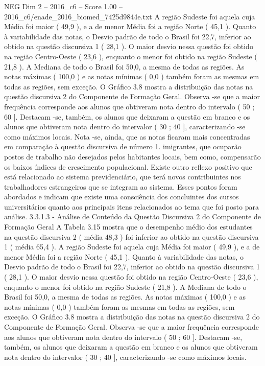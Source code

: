\begin{textsample}{NEG Dim 2 – 2016\_c6 – Score 1.00 – 2016\_c6/enade\_2016\_biomed\_7425d9844e.txt}
A região Sudeste foi aquela cuja Média foi maior ( 49,9 ), e a de menor Média foi a região Norte ( 45,1 ).
Quanto à variabilidade das notas, o Desvio padrão de todo o Brasil foi 22,7, inferior ao obtido na questão discursiva 1 ( 28,1 ).
O maior desvio nessa questão foi obtido na região Centro-Oeste ( 23,6 ), enquanto o menor foi obtido na região Sudeste ( 21,8 ).
A Mediana de todo o Brasil foi 50,0, a mesma de todas as regiões.
As notas máximas ( 100,0 ) e as notas mínimas ( 0,0 ) também foram as mesmas em todas as regiões, sem exceção.
O Gráfico 3.8 mostra a distribuição das notas na questão discursiva 2 do Componente de Formação Geral.
Observa -se que a maior frequência corresponde aos alunos que obtiveram nota dentro do intervalo ( 50 ; 60 ].
Destacam -se, também, os alunos que deixaram a questão em branco e os alunos que obtiveram nota dentro do intervalor ( 30 ; 40 ], caracterizando -se como máximos locais.
Nota -se, ainda, que as notas ficaram mais concentradas em comparação à questão discursiva de número 1. imigrantes, que ocuparão postos de trabalho não desejados pelos habitantes locais, bem como, compensarão os baixos índices de crescimento populacional.
Existe outro reflexo positivo que está relacionado ao sistema previdenciário, que terá novos contribuintes nos trabalhadores estrangeiros que se integram ao sistema.
Esses pontos foram abordados e indicam que existe uma consciência dos concluintes dos cursos universitários quanto aos principais itens relacionados ao tema que foi posto para análise. 3.3.1.3 - Análise de Conteúdo da Questão Discursiva 2 do Componente de Formação Geral A Tabela 3.15 mostra que o desempenho médio dos estudantes na questão discursiva 2 ( média 48,3 ) foi inferior ao obtido na questão discursiva 1 ( média 65,4 ).
A região Sudeste foi aquela cuja Média foi maior ( 49,9 ), e a de menor Média foi a região Norte ( 45,1 ).
Quanto à variabilidade das notas, o Desvio padrão de todo o Brasil foi 22,7, inferior ao obtido na questão discursiva 1 ( 28,1 ).
O maior desvio nessa questão foi obtido na região Centro-Oeste ( 23,6 ), enquanto o menor foi obtido na região Sudeste ( 21,8 ).
A Mediana de todo o Brasil foi 50,0, a mesma de todas as regiões.
As notas máximas ( 100,0 ) e as notas mínimas ( 0,0 ) também foram as mesmas em todas as regiões, sem exceção.
O Gráfico 3.8 mostra a distribuição das notas na questão discursiva 2 do Componente de Formação Geral.
Observa -se que a maior frequência corresponde aos alunos que obtiveram nota dentro do intervalo ( 50 ; 60 ].
Destacam -se, também, os alunos que deixaram a questão em branco e os alunos que obtiveram nota dentro do intervalor ( 30 ; 40 ], caracterizando -se como máximos locais.

\end{textsample}
